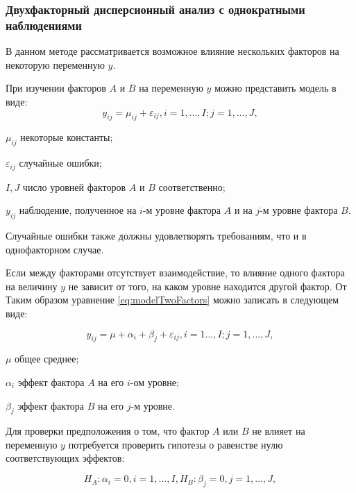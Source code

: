 \subsubsection{Двухфакторный дисперсионный анализ с однократными наблюдениями}
В данном методе рассматривается возможное влияние нескольких факторов на некоторую переменную $y$.

При изучении факторов $A$ и $B$ на переменную $y$ можно представить модель в виде:
\begin{equation}
\label{eq:modelTwoFactors}
y_{ij}=\mu_{ij}+\varepsilon_{ij},i=1,...,I;j=1,...,J,
\end{equation}
\begin{eqexpl}[15mm]
\item{$\mu_{ij}$} некоторые константы;
\item{$\varepsilon_{ij}$} случайные ошибки;
\item{$I,J$} число уровней факторов $A$ и $B$ соответственно;
\item{$y_{ij}$} наблюдение, полученное на $i$-м уровне фактора $A$ и на $j$-м уровне фактора $B$.
\end{eqexpl}

Случайные ошибки также должны удовлетворять требованиям, что и в однофакторном случае.

Если между факторами отсутствует взаимодействие, то влияние одного фактора на величину $y$ не зависит от того, на каком уровне находится другой фактор. От Таким образом уравнение \eqref{eq:modelTwoFactors} можно записать в следующем виде:

\begin{equation}
\label{eq:newModel}
y_{ij}=\mu+\alpha_i+\beta_j+\varepsilon_{ij}, i=1...,I;j=1,...,J,
\end{equation}
\begin{eqexpl}[15mm]
\item{$\mu$} общее среднее;
\item{$\alpha_i$} эффект фактора $A$ на его $i$-ом уровне;
\item{$\beta_j$} эффект фактора $B$ на его $j$-м уровне.
\end{eqexpl}

Для проверки предположения о том, что фактор $A$ или $B$ не влияет на переменную $y$ потребуется проверить гипотезы о равенстве нулю соответствующих эффектов:

\begin{equation}
\label{eq:hyposForNewModel}
H_A:\alpha_i=0,i=1,...,I, H_B:\beta_j=0,j=1,...,J,
\end{equation}

